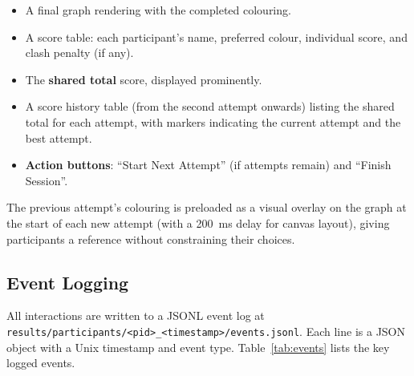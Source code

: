 \documentclass[11pt]{article}
\theoremstyle{definition}
\begin{document}
\begin{itemize}[nosep]
  \item A final graph rendering with the completed colouring.
  \item A score table: each participant's name, preferred colour, individual score, and
    clash penalty (if any).
  \item The \textbf{shared total} score, displayed prominently.
  \item A score history table (from the second attempt onwards) listing the shared
    total for each attempt, with markers indicating the current attempt and the best
    attempt.
  \item \textbf{Action buttons}: ``Start Next Attempt'' (if attempts remain) and
    ``Finish Session''.
\end{itemize}

The previous attempt's colouring is preloaded as a visual overlay on the graph at the
start of each new attempt (with a 200~ms delay for canvas layout), giving participants a
reference without constraining their choices.

\subsection{Event Logging}

All interactions are written to a JSONL event log at\\
\texttt{results/participants/<pid>\_<timestamp>/events.jsonl}.  Each line is a JSON
object with a Unix timestamp and event type.  Table~\ref{tab:events} lists the key
logged events.
\end{document}

